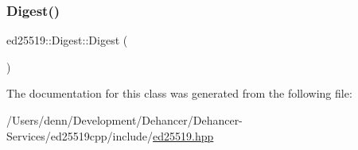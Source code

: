 \mbox{\label{classed25519_1_1_digest_a032b74cccbe09b962b0d148ce6fa9eaa}} 
\subsubsection{\texorpdfstring{Digest()}{Digest()}\hspace{0.1cm}{\footnotesize\ttfamily [2/2]}}
{\footnotesize\ttfamily ed25519\+::\+Digest\+::\+Digest (\begin{DoxyParamCaption}{ }\end{DoxyParamCaption})}



The documentation for this class was generated from the following file\+:\begin{DoxyCompactItemize}
\item 
/\+Users/denn/\+Development/\+Dehancer/\+Dehancer-\/\+Services/ed25519cpp/include/\mbox{\hyperlink{ed25519_8hpp}{ed25519.\+hpp}}\end{DoxyCompactItemize}
